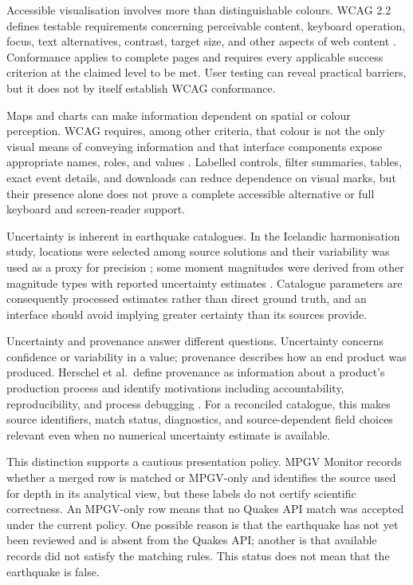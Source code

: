 \documentclass[12pt]{article}
\begin{document}
Accessible visualisation involves more than distinguishable colours. WCAG 2.2 defines testable requirements concerning perceivable content, keyboard operation, focus, text alternatives, contrast, target size, and other aspects of web content \cite{WCAG22}. Conformance applies to complete pages and requires every applicable success criterion at the claimed level to be met. User testing can reveal practical barriers, but it does not by itself establish WCAG conformance.

Maps and charts can make information dependent on spatial or colour perception. WCAG requires, among other criteria, that colour is not the only visual means of conveying information and that interface components expose appropriate names, roles, and values \cite{WCAG22}. Labelled controls, filter summaries, tables, exact event details, and downloads can reduce dependence on visual marks, but their presence alone does not prove a complete accessible alternative or full keyboard and screen-reader support.

Uncertainty is inherent in earthquake catalogues. In the Icelandic harmonisation study, locations were selected among source solutions and their variability was used as a proxy for precision \cite[p.~2203]{Jonasson2021}; some moment magnitudes were derived from other magnitude types with reported uncertainty estimates \cite[pp.~2204--2207]{Jonasson2021}. Catalogue parameters are consequently processed estimates rather than direct ground truth, and an interface should avoid implying greater certainty than its sources provide.

Uncertainty and provenance answer different questions. Uncertainty concerns confidence or variability in a value; provenance describes how an end product was produced. Herschel et al.\ define provenance as information about a product's production process and identify motivations including accountability, reproducibility, and process debugging \cite[p.~881]{Herschel2017}. For a reconciled catalogue, this makes source identifiers, match status, diagnostics, and source-dependent field choices relevant even when no numerical uncertainty estimate is available.

This distinction supports a cautious presentation policy. MPGV Monitor records whether a merged row is matched or MPGV-only and identifies the source used for depth in its analytical view, but these labels do not certify scientific correctness. An MPGV-only row means that no Quakes API match was accepted under the current policy. One possible reason is that the earthquake has not yet been reviewed and is absent from the Quakes API; another is that available records did not satisfy the matching rules. This status does not mean that the earthquake is false.
\end{document}
